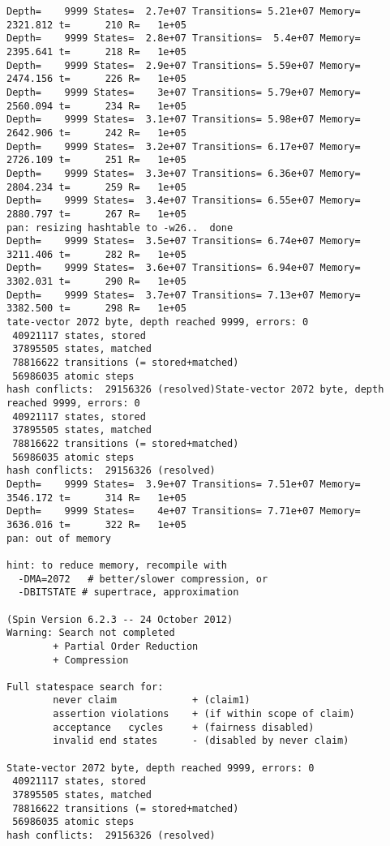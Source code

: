 \documentclass{llncs}
\begin{document}
\begin{lstlisting}[frame=single]
Depth=    9999 States=  2.7e+07 Transitions= 5.21e+07 Memory=  2321.812 t=      210 R=   1e+05
Depth=    9999 States=  2.8e+07 Transitions=  5.4e+07 Memory=  2395.641 t=      218 R=   1e+05
Depth=    9999 States=  2.9e+07 Transitions= 5.59e+07 Memory=  2474.156 t=      226 R=   1e+05
Depth=    9999 States=    3e+07 Transitions= 5.79e+07 Memory=  2560.094 t=      234 R=   1e+05
Depth=    9999 States=  3.1e+07 Transitions= 5.98e+07 Memory=  2642.906 t=      242 R=   1e+05
Depth=    9999 States=  3.2e+07 Transitions= 6.17e+07 Memory=  2726.109 t=      251 R=   1e+05
Depth=    9999 States=  3.3e+07 Transitions= 6.36e+07 Memory=  2804.234 t=      259 R=   1e+05
Depth=    9999 States=  3.4e+07 Transitions= 6.55e+07 Memory=  2880.797 t=      267 R=   1e+05
pan: resizing hashtable to -w26..  done
Depth=    9999 States=  3.5e+07 Transitions= 6.74e+07 Memory=  3211.406 t=      282 R=   1e+05
Depth=    9999 States=  3.6e+07 Transitions= 6.94e+07 Memory=  3302.031 t=      290 R=   1e+05
Depth=    9999 States=  3.7e+07 Transitions= 7.13e+07 Memory=  3382.500 t=      298 R=   1e+05
tate-vector 2072 byte, depth reached 9999, errors: 0
 40921117 states, stored
 37895505 states, matched
 78816622 transitions (= stored+matched)
 56986035 atomic steps
hash conflicts:  29156326 (resolved)State-vector 2072 byte, depth reached 9999, errors: 0
 40921117 states, stored
 37895505 states, matched
 78816622 transitions (= stored+matched)
 56986035 atomic steps
hash conflicts:  29156326 (resolved)
Depth=    9999 States=  3.9e+07 Transitions= 7.51e+07 Memory=  3546.172 t=      314 R=   1e+05
Depth=    9999 States=    4e+07 Transitions= 7.71e+07 Memory=  3636.016 t=      322 R=   1e+05
pan: out of memory

hint: to reduce memory, recompile with
  -DMA=2072   # better/slower compression, or
  -DBITSTATE # supertrace, approximation

(Spin Version 6.2.3 -- 24 October 2012)
Warning: Search not completed
        + Partial Order Reduction
        + Compression

Full statespace search for:
        never claim             + (claim1)
        assertion violations    + (if within scope of claim)
        acceptance   cycles     + (fairness disabled)
        invalid end states      - (disabled by never claim)

State-vector 2072 byte, depth reached 9999, errors: 0
 40921117 states, stored
 37895505 states, matched
 78816622 transitions (= stored+matched)
 56986035 atomic steps
hash conflicts:  29156326 (resolved)


\end{lstlisting}
\end{document}
